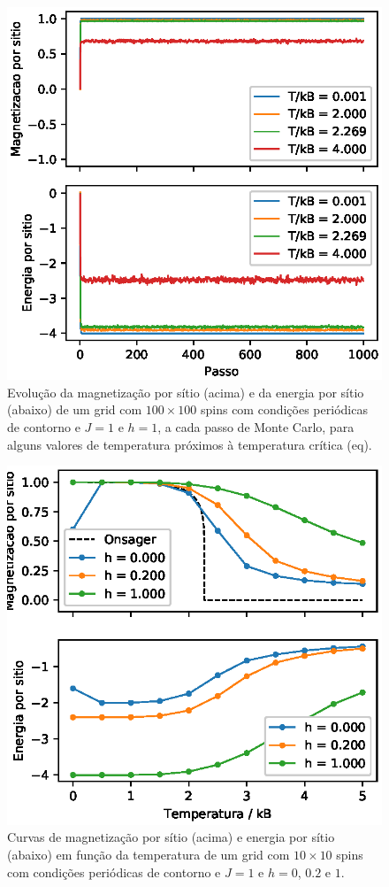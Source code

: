 \begin{figure}[ht]
	\centering
	\includegraphics[scale = 1]{./img/evolucao-h=1-mc-temperaturas}
    \caption{Evolução da magnetização por sítio (acima) e da energia por sítio (abaixo) de um grid com $100 \times 100$ spins com condições periódicas de contorno e $J = 1$ e $h = 1$, a cada passo de Monte Carlo, para alguns valores de temperatura próximos à temperatura crítica (eq).}
    \label{fig:evolucao-h=1-mc-temperaturas}
\end{figure}

\begin{figure}[ht]
	\centering
	\includegraphics[scale = 1]{./img/simulacao-h}
    \caption{Curvas de magnetização por sítio (acima) e energia por sítio (abaixo) em função da temperatura de um grid com $10 \times 10$ spins com condições periódicas de contorno e $J = 1$ e $h = 0$, $0.2$ e $1$.}
    \label{fig:simulacao-h}
\end{figure}